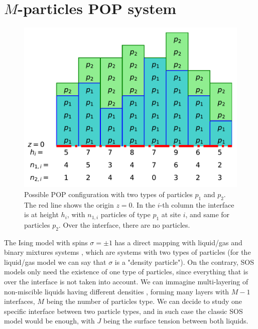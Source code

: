 \section{$M$-particles POP system}

\begin{figure}
\centering
\includegraphics[width=0.7\linewidth]{pop/figure-pop.pdf}
\caption{Possible POP configuration with two types of particles $p_1$ and $p_2$. The red line shows the origin $z=0$. In the $i$-th column the interface is at height $h_i$, with $n_{1,i}$ particles of type $p_1$ at site $i$, and same for particles $p_2$. Over the interface, there are no particles. }
\label{fig-pop}
\end{figure}

The Ising model with spins $\sigma= \pm1$ has a direct mapping with liquid/gas and binary mixtures systems \cite{goldenfeld_lectures_2018}, which are systems with two types of particles (for the liquid/gas model we can say that $\sigma$ is a "density particle"). On the contrary, SOS models only need the existence of one type of particles, since everything that is over the interface is not taken into account. We can immagine multi-layering of non-miscible liquids having different densities \cite{wang_instability_1978,bonizzi_simulation_2003}, forming many layers with $M-1$ interfaces, $M$ being the number of particles type. We can decide to study one specific interface between two particle types, and in such case the classic SOS model would be enough, with $J$ being the surface tension between both liquids. 

